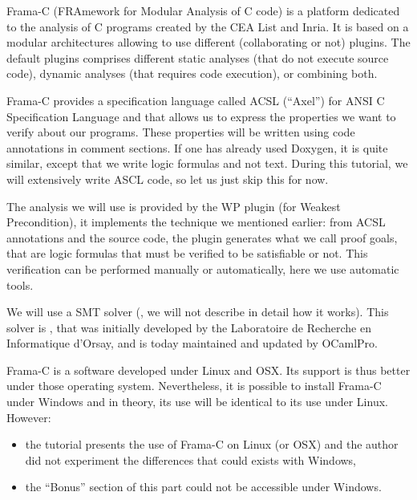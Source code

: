 





Frama-C (FRAmework for Modular Analysis of C code) is a platform
dedicated to the analysis of C programs created by the CEA List and
Inria. It is based on a modular architectures allowing to use different
(collaborating or not) plugins. The default plugins comprises different
static analyses (that do not execute source code), dynamic analyses
(that requires code execution), or combining both.



Frama-C provides a specification language called ACSL (``Axel'') for
ANSI C Specification Language and that allows us to express the
properties we want to verify about our programs. These properties will
be written using code annotations in comment sections. If one has
already used Doxygen, it is quite similar, except that we write logic
formulas and not text. During this tutorial, we will extensively write
ASCL code, so let us just skip this for now.



The analysis we will use is provided by the WP plugin (for Weakest
Precondition), it implements the technique we mentioned earlier: from
ACSL annotations and the source code, the plugin generates what we call
proof goals, that are logic formulas that must be verified to be
satisfiable or not. This verification can be performed manually or
automatically, here we use automatic tools.



We will use a SMT solver
(, we will not describe in detail how it works). This solver is
, that was initially developed
by the Laboratoire de Recherche en Informatique d'Orsay, and is today
maintained and updated by OCamlPro.






Frama-C is a software developed under Linux and OSX. Its support is thus better
under those operating system. Nevertheless, it is possible to install Frama-C
under Windows and in theory, its use will be identical to its use under Linux.
However:



\begin{Warning}
\begin{itemize}
  \item the tutorial presents the use of Frama-C on Linux (or OSX) and
    the author did not experiment the differences that could exists with Windows,
  \item the ``Bonus'' section of this part could not be accessible under Windows.
  \end{itemize}
\end{Warning}


